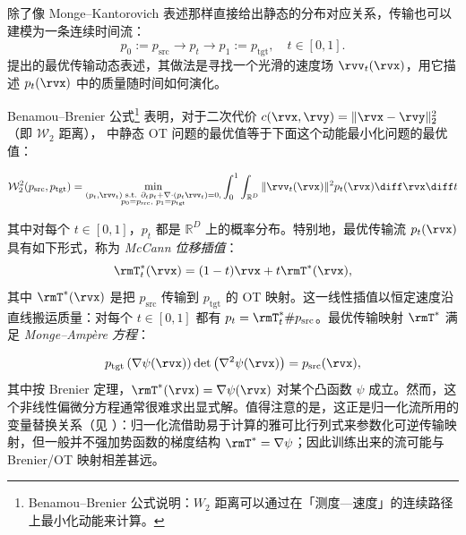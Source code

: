 除了像 Monge--Kantorovich 表述那样直接给出静态的分布对应关系，传输也可以建模为一条连续时间流：
\begin{equation*}
    p_0 := p_{\mathrm{src}} \to p_t \to p_1 := p_{\mathrm{tgt}}, \quad t \in [0,1].
\end{equation*}
\citet{benamou2000computational} 提出的最优传输动态表述，其做法是寻找一个光滑的速度场 $\rvv_t(\rvx)$，用它描述 $p_t(\rvx)$ 中的质量随时间如何演化。

Benamou--Brenier 公式\footnote{Benamou--Brenier 公式说明：$W_2$ 距离可以通过在「测度—速度」的连续路径上最小化动能来计算。} 表明，对于二次代价 $c(\rvx, \rvy) = \|\rvx - \rvy\|_2^2$（即 $\mathcal{W}_2$ 距离）， 中静态 OT 问题的最优值等于下面这个动能最小化问题的最优值：

\begin{mdframed}
   \begin{equation}\label{eq:bb-ot}
    \mathcal{W}_2^2(p_{\mathrm{src}}, p_{\mathrm{tgt}}) = \min_{\substack{ (p_t, \rvv_t) \text{ s.t. }
        \partial_t p_t + \nabla \cdot (p_t \rvv_t) = 0, \\
        p_0 = p_{\mathrm{src}},\,\, p_1 = p_{\mathrm{tgt}}
    }}
    \int_0^1 \int_{\mathbb{R}^D} \|\rvv_t(\rvx)\|^2 p_t(\rvx) \diff\rvx \diff t
\end{equation}
\end{mdframed}
其中对每个 $t \in [0,1]$，$p_t$ 都是 $\mathbb{R}^D$ 上的概率分布。特别地，最优传输流 $p_t(\rvx)$ 具有如下形式，称为 \textit{McCann 位移插值}：
\begin{equation*}
    \rmT_t^*(\rvx) = (1 - t)\rvx + t\rmT^*(\rvx),
\end{equation*}
其中 $\rmT^*(\rvx)$ 是把 $p_{\mathrm{src}}$ 传输到 $p_{\mathrm{tgt}}$ 的 OT 映射。这一线性插值以恒定速度沿直线搬运质量：对每个 $t \in [0,1]$ 都有 $p_t = \rmT_t^*\#p_{\mathrm{src}}$。最优传输映射 $\rmT^*$ 满足 \emph{Monge--Ampère 方程}：

\begin{equation}\label{eq:monge-ampere}
    p_{\mathrm{tgt}}\left(\nabla \psi(\rvx)\right) \det\left(\nabla^2 \psi(\rvx)\right) = p_{\mathrm{src}}(\rvx),
\end{equation}
其中按 Brenier 定理，$\rmT^*(\rvx) = \nabla \psi(\rvx)$ 对某个凸函数 $\psi$ 成立。然而，这个非线性偏微分方程通常很难求出显式解。值得注意的是，这正是归一化流所用的变量替换关系（见 ）：归一化流借助易于计算的雅可比行列式来参数化可逆传输映射，但一般并不强加势函数的梯度结构 $\rmT^*=\nabla\psi$；因此训练出来的流可能与 Brenier/OT 映射相差甚远。


